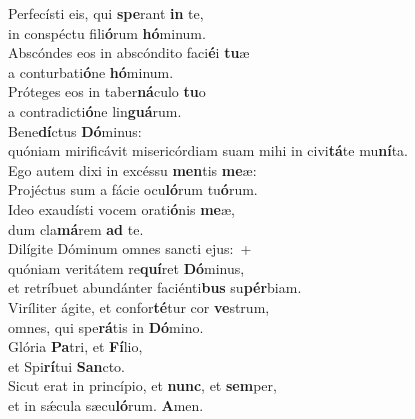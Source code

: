 \evenverse Perfecísti eis, qui \textbf{spe}rant \textbf{in} te,~\*\\
\evenverse in conspéctu fili\textbf{ó}rum \textbf{hó}minum.\\
\oddverse Abscóndes eos in abscóndito faci\textbf{é}i \textbf{tu}æ~\*\\
\oddverse a conturbati\textbf{ó}ne \textbf{hó}minum.\\
\evenverse Próteges eos in taber\textbf{ná}culo \textbf{tu}o~\*\\
\evenverse a contradicti\textbf{ó}ne lin\textbf{guá}rum.\\
\oddverse Bene\textbf{dí}ctus \textbf{Dó}minus:~\*\\
\oddverse quóniam mirificávit misericórdiam suam mihi in civi\textbf{tá}te mu\textbf{ní}ta.\\
\evenverse Ego autem dixi in excéssu \textbf{men}tis \textbf{me}æ:~\*\\
\evenverse Projéctus sum a fácie ocu\textbf{ló}rum tu\textbf{ó}rum.\\
\oddverse Ideo exaudísti vocem orati\textbf{ó}nis \textbf{me}æ,~\*\\
\oddverse dum cla\textbf{má}rem \textbf{ad} te.\\
\evenverse Dilígite Dóminum omnes sancti ejus:~+\\
\evenverse  quóniam veritátem re\textbf{quí}ret \textbf{Dó}minus,~\*\\
\evenverse et retríbuet abundánter faciénti\textbf{bus} su\textbf{pér}biam.\\
\oddverse Viríliter ágite, et confor\textbf{té}tur cor \textbf{ve}strum,~\*\\
\oddverse omnes, qui spe\textbf{rá}tis in \textbf{Dó}mino.\\
\evenverse Glória \textbf{Pa}tri, et \textbf{Fí}lio,~\*\\
\evenverse et Spi\textbf{rí}tui \textbf{San}cto.\\
\oddverse Sicut erat in princípio, et \textbf{nunc}, et \textbf{sem}per,~\*\\
\oddverse et in sǽcula sæcu\textbf{ló}rum. \textbf{A}men.\\
